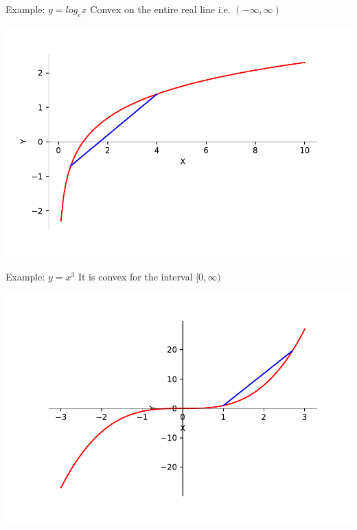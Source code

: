 \documentclass{beamer}
\begin{document}
	\begin{frame}{Example: $y = log_ex$}
	Convex on the entire real line i.e. $(-\infty, \infty)$
	\begin{center}
	\includegraphics[scale=0.5]{y-logx}
	\end{center}
	\end{frame}

	\begin{frame}{Example: $y = x^3$}
	It is convex for the interval $[0,\infty)$
	\begin{center}
	\includegraphics[scale=0.5]{y-x3_pos}
	\end{center}
	\end{frame}
\end{document}
